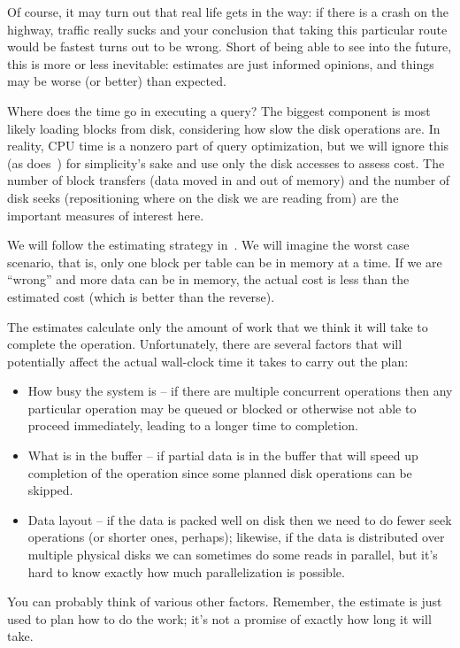 Of course, it may turn out that real life gets in the way: if there is a crash on the highway, traffic really sucks and your conclusion that taking this particular route would be fastest turns out to be wrong. Short of being able to see into the future, this is more or less inevitable: estimates are just informed opinions, and things may be worse (or better) than expected. 

Where does the time go in executing a query? The biggest component is most likely loading blocks from disk, considering how slow the disk operations are. In reality, CPU time is a nonzero part of query optimization, but we will ignore this (as does~\cite{dsc}) for simplicity's sake and use only the disk accesses to assess cost. The number of block transfers (data moved in and out of memory) and the number of disk seeks (repositioning where on the disk we are reading from) are the important measures of interest here. 

We will follow the estimating strategy in~\cite{dsc}. We will imagine the worst case scenario, that is, only one block per table can be in memory at a time. If we are ``wrong'' and more data can be in memory, the actual cost is less than the estimated cost (which is better than the reverse). 

The estimates calculate only the amount of work that we think it will take to complete the operation. Unfortunately, there are several factors that will potentially affect the actual wall-clock time it takes to carry out the plan:

\begin{itemize}
	\item How busy the system is -- if there are multiple concurrent operations then any particular operation may be queued or blocked or otherwise not able to proceed immediately, leading to a longer time to completion.
	\item What is in the buffer -- if partial data is in the buffer that will speed up completion of the operation since some planned disk operations can be skipped.
	\item Data layout -- if the data is packed well on disk then we need to do fewer seek operations (or shorter ones, perhaps); likewise, if the data is distributed over multiple physical disks we can sometimes do some reads in parallel, but it's hard to know exactly how much parallelization is possible.
\end{itemize}

You can probably think of various other factors. Remember, the estimate is just used to plan how to do the work; it's not a promise of exactly how long it will take.

